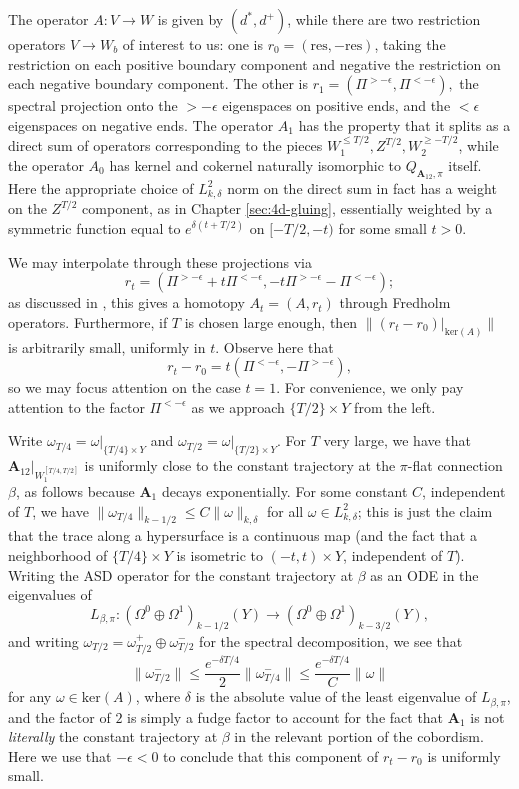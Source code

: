 \documentclass[10pt,a4paper]{amsart}
\theoremstyle{definition}
\theoremstyle{remark}
\numberwithin{figure}{qchap}
\begin{document}
The operator $A: V \to W$ is given by $(d^*, d^+)$, while there are two restriction operators $V \to W_b$ of interest to us: one is $r_0 = (\text{res}, -\text{res})$, taking the restriction on each positive boundary component and negative the restriction on each negative boundary component. The other is $r_1 = (\Pi^{>-\epsilon}, \Pi^{<-\epsilon}),$ the spectral projection onto the $>-\epsilon$ eigenspaces on positive ends, and the $<\epsilon$ eigenspaces on negative ends. The operator $A_1$ has the property that it splits as a direct sum of operators corresponding to the pieces $W_1^{\leq T/2}, Z^{T/2}, W_2^{\geq -T/2}$, while the operator $A_0$ has kernel and cokernel naturally isomorphic to $Q_{\mathbf{A}_{12},\pi}$ itself. Here the appropriate choice of $L^2_{k,\delta}$ norm on the direct sum in fact has a weight on the $Z^{T/2}$ component, as in Chapter \ref{sec:4d-gluing}, essentially weighted by a symmetric function equal to $e^{\delta(t+T/2)}$ on $[-T/2, -t)$ for some small $t >0$.

We may interpolate through these projections via 
$$r_t = (\Pi^{>-\epsilon} + t\Pi^{<-\epsilon}, -t\Pi^{>-\epsilon} - \Pi^{< -\epsilon});$$ 
as discussed in \cite[Section~20.3]{KMSW}, this gives a homotopy $A_t = (A, r_t)$ through Fredholm operators. Furthermore, if $T$ is chosen large enough, then $\|(r_t - r_0)\big|_{\text{ker}(A)}\|$ is arbitrarily small, uniformly in $t$. Observe here that 
$$r_t - r_0 = t(\Pi^{<-\epsilon},-\Pi^{>-\epsilon}),$$ 
so we may focus attention on the case $t = 1$. For convenience, we only pay attention to the factor $\Pi^{<-\epsilon}$ as we approach $\{T/2\} \times Y$ from the left.

Write $\omega_{T/4} = \omega\big|_{\{T/4\} \times Y}$ and $\omega_{T/2} = \omega\big|_{\{T/2\} \times Y}$. For $T$ very large, we have that $\mathbf{A}_{12} \big|_{W_1^{[T/4, T/2]}}$ is uniformly close to the constant trajectory at the $\pi$-flat connection $\beta$, as follows because $\mathbf{A}_1$ decays exponentially. For some constant $C$, independent of $T$, we have $\|\omega_{T/4}\|_{k-1/2} \leq C\|\omega\|_{k,\delta}$ for all $\omega \in L^2_{k,\delta}$; this is just the claim that the trace along a hypersurface is a continuous map (and the fact that a neighborhood of $\{T/4\} \times Y$ is isometric to $(-t, t) \times Y$, independent of $T$). Writing the ASD operator for the constant trajectory at $\beta$ as an ODE in the eigenvalues of 
$$L_{\beta, \pi}: (\Omega^0\oplus \Omega^1)_{k-1/2}(Y) \to (\Omega^0 \oplus \Omega^1)_{k-3/2}(Y),$$ 
and writing $\omega_{T/2} = \omega^+_{T/2} \oplus \omega^-_{T/2}$ for the spectral decomposition, we see that $$\|\omega_{T/2}^-\| \leq \frac{e^{-\delta T/4}}{2} \|\omega_{T/4}^-\| \leq \frac{e^{-\delta T/4}}{C} \|\omega\|$$ for any $\omega \in \text{ker}(A)$, where $\delta$ is the absolute value of the least eigenvalue of $L_{\beta, \pi}$, and the factor of $2$ is simply a fudge factor to account for the fact that $\mathbf{A}_1$ is not \emph{literally} the constant trajectory at $\beta$ in the relevant portion of the cobordism. Here we use that $-\epsilon < 0$ to conclude that this component of $r_t - r_0$ is uniformly small.
\end{document}
